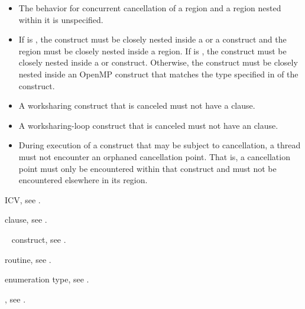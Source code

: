 \begin{itemize}
\item The behavior for concurrent cancellation of a region and a region nested 
      within it is unspecified.
\item If  is , the 
      construct must be closely nested inside a  or a  construct and the
       region must be closely nested inside a  
      region. If  is , the 
       construct must be closely nested inside a  
      or  construct. Otherwise, the  construct must 
      be closely nested inside an OpenMP construct that matches the type 
      specified in  of the  construct.
\item A worksharing construct that is canceled must not have a  clause.
\item A worksharing-loop construct that is canceled must not have an 
       clause.
\item During execution of a construct that may be subject to cancellation, a
      thread must not encounter an orphaned cancellation point. That is, a
      cancellation point must only be encountered within that construct and must
      not be encountered elsewhere in its region.
\end{itemize}

\begin{crossrefs}
\item {} ICV, see
.

\item {} clause, see .

\item {}~ construct, see
.

\item {} routine, see
.

\item {} enumeration type, see .

\item {}, see .
\end{crossrefs}



